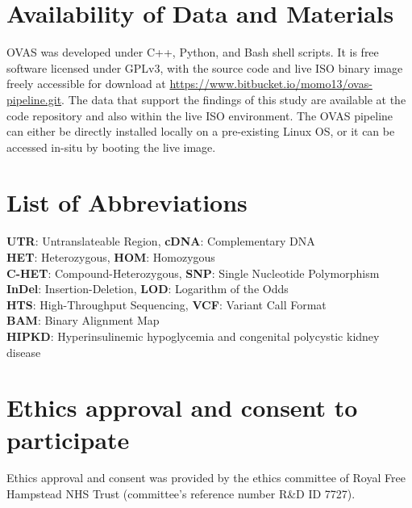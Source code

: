 \documentclass[twocolumn]{bmcart}%
\def\app{OVAS}
\begin{document}

\begin{backmatter}

\section*{Availability of Data and Materials}
\app{} was developed under C++, Python, and Bash shell scripts. It is free software licensed under GPLv3, with the source code and live ISO binary image freely accessible for download at \url{https://www.bitbucket.io/momo13/ovas-pipeline.git}. The data that support the findings of this study are available at the code repository and also within the live ISO environment. The \app{} pipeline can either be directly installed locally on a pre-existing Linux OS, or it can be accessed in-situ by booting the live image.


\section*{List of Abbreviations}
\textbf{UTR}:  Untranslateable Region, \textbf{cDNA}: Complementary DNA\\
\textbf{HET}: Heterozygous, \textbf{HOM}: Homozygous\\
\textbf{C-HET}: Compound-Heterozygous, \textbf{SNP}: Single Nucleotide Polymorphism\\
\textbf{InDel}: Insertion-Deletion, \textbf{LOD}: Logarithm of the Odds\\
\textbf{HTS}: High-Throughput Sequencing, \textbf{VCF}: Variant Call Format\\
\textbf{BAM}: Binary Alignment Map\\
\textbf{HIPKD}: Hyperinsulinemic hypoglycemia and congenital polycystic kidney disease\\


\section*{Ethics approval and consent to participate}
Ethics approval and consent was provided by the ethics committee of Royal Free Hampstead NHS Trust (committee's reference number R\&D ID 7727).


\end{backmatter}
\end{document}
